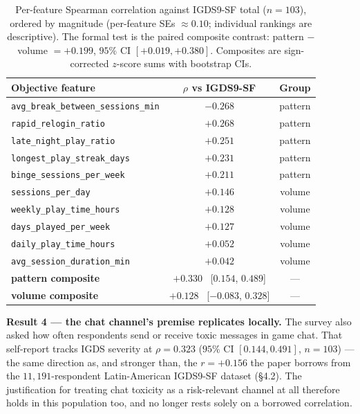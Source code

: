 \documentclass[11pt,a4paper]{article}
\begin{document}
\begin{table}[ht]
\centering
\footnotesize
\caption{Per-feature Spearman correlation against IGDS9-SF total ($n{=}103$),
ordered by magnitude (per-feature SEs ${\approx}0.10$; individual rankings are
descriptive). The formal test is the paired composite contrast: pattern $-$
volume $= +0.199$, $95\%$ CI $[+0.019, +0.380]$. Composites are sign-corrected
$z$-score sums with bootstrap CIs.}
\label{tab:surveyfeat}
\begin{tabular}{lcc}
\toprule
\textbf{Objective feature} & \textbf{$\rho$ vs IGDS9-SF} & \textbf{Group} \\
\midrule
\texttt{avg\_break\_between\_sessions\_min} & $-0.268$ & pattern \\
\texttt{rapid\_relogin\_ratio}              & $+0.268$ & pattern \\
\texttt{late\_night\_play\_ratio}           & $+0.251$ & pattern \\
\texttt{longest\_play\_streak\_days}        & $+0.231$ & pattern \\
\texttt{binge\_sessions\_per\_week}         & $+0.211$ & pattern \\
\midrule
\texttt{sessions\_per\_day}                 & $+0.146$ & volume \\
\texttt{weekly\_play\_time\_hours}          & $+0.128$ & volume \\
\texttt{days\_played\_per\_week}            & $+0.127$ & volume \\
\texttt{daily\_play\_time\_hours}           & $+0.052$ & volume \\
\texttt{avg\_session\_duration\_min}        & $+0.042$ & volume \\
\midrule
\textbf{pattern composite} & $\mathbf{+0.330}$ \ [$0.154$, $0.489$] & --- \\
\textbf{volume composite}  & $+0.128$ \ [$-0.083$, $0.328$] & --- \\
\bottomrule
\end{tabular}
\end{table}

\textbf{Result 4 --- the chat channel's premise replicates locally.} The survey
also asked how often respondents send or receive toxic messages in game chat.
That self-report tracks IGDS severity at $\rho = 0.323$ ($95\%$ CI
$[0.144, 0.491]$, $n{=}103$) --- the same direction as, and stronger than, the
$r = +0.156$ the paper borrows from the $11{,}191$-respondent Latin-American
IGDS9-SF dataset (\S4.2). The justification for treating chat toxicity as a
risk-relevant channel at all therefore holds in this population too, and no
longer rests solely on a borrowed correlation.
\end{document}
